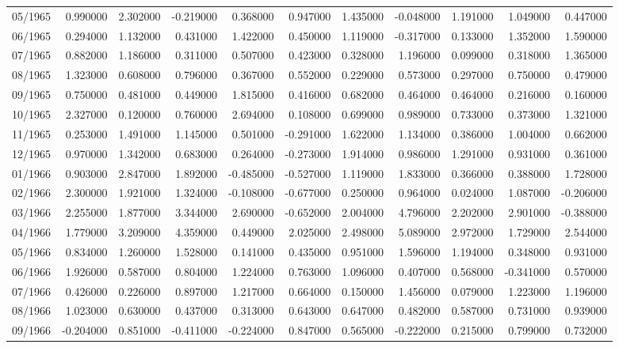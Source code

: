 \begin{tabular}{lrrrrrrrrrr}
05/1965 & 0.990000 & 2.302000 & -0.219000 & 0.368000 & 0.947000 & 1.435000 & -0.048000 & 1.191000 & 1.049000 & 0.447000 \\
06/1965 & 0.294000 & 1.132000 & 0.431000 & 1.422000 & 0.450000 & 1.119000 & -0.317000 & 0.133000 & 1.352000 & 1.590000 \\
07/1965 & 0.882000 & 1.186000 & 0.311000 & 0.507000 & 0.423000 & 0.328000 & 1.196000 & 0.099000 & 0.318000 & 1.365000 \\
08/1965 & 1.323000 & 0.608000 & 0.796000 & 0.367000 & 0.552000 & 0.229000 & 0.573000 & 0.297000 & 0.750000 & 0.479000 \\
09/1965 & 0.750000 & 0.481000 & 0.449000 & 1.815000 & 0.416000 & 0.682000 & 0.464000 & 0.464000 & 0.216000 & 0.160000 \\
10/1965 & 2.327000 & 0.120000 & 0.760000 & 2.694000 & 0.108000 & 0.699000 & 0.989000 & 0.733000 & 0.373000 & 1.321000 \\
11/1965 & 0.253000 & 1.491000 & 1.145000 & 0.501000 & -0.291000 & 1.622000 & 1.134000 & 0.386000 & 1.004000 & 0.662000 \\
12/1965 & 0.970000 & 1.342000 & 0.683000 & 0.264000 & -0.273000 & 1.914000 & 0.986000 & 1.291000 & 0.931000 & 0.361000 \\
01/1966 & 0.903000 & 2.847000 & 1.892000 & -0.485000 & -0.527000 & 1.119000 & 1.833000 & 0.366000 & 0.388000 & 1.728000 \\
02/1966 & 2.300000 & 1.921000 & 1.324000 & -0.108000 & -0.677000 & 0.250000 & 0.964000 & 0.024000 & 1.087000 & -0.206000 \\
03/1966 & 2.255000 & 1.877000 & 3.344000 & 2.690000 & -0.652000 & 2.004000 & 4.796000 & 2.202000 & 2.901000 & -0.388000 \\
04/1966 & 1.779000 & 3.209000 & 4.359000 & 0.449000 & 2.025000 & 2.498000 & 5.089000 & 2.972000 & 1.729000 & 2.544000 \\
05/1966 & 0.834000 & 1.260000 & 1.528000 & 0.141000 & 0.435000 & 0.951000 & 1.596000 & 1.194000 & 0.348000 & 0.931000 \\
06/1966 & 1.926000 & 0.587000 & 0.804000 & 1.224000 & 0.763000 & 1.096000 & 0.407000 & 0.568000 & -0.341000 & 0.570000 \\
07/1966 & 0.426000 & 0.226000 & 0.897000 & 1.217000 & 0.664000 & 0.150000 & 1.456000 & 0.079000 & 1.223000 & 1.196000 \\
08/1966 & 1.023000 & 0.630000 & 0.437000 & 0.313000 & 0.643000 & 0.647000 & 0.482000 & 0.587000 & 0.731000 & 0.939000 \\
09/1966 & -0.204000 & 0.851000 & -0.411000 & -0.224000 & 0.847000 & 0.565000 & -0.222000 & 0.215000 & 0.799000 & 0.732000 \\

\end{tabular}

